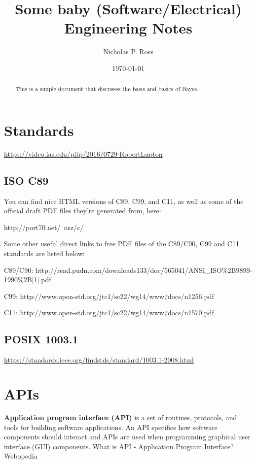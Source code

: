 \documentclass[11pt]{article}
\begin{document}
\title{Some baby (Software/Electrical) Engineering Notes}
\author{Nicholas P. Ross}
\date{\today}
\maketitle


\begin{abstract}
This is a simple document that discusses the basis and basics of Bayes. 
\end{abstract}


\tableofcontents


\newpage
\section{Standards}
\href{https://video.ias.edu/pitp/2016/0729-RobertLupton}{https://video.ias.edu/pitp/2016/0729-RobertLupton}

\subsection{ISO C89}
You can find nice HTML versions of C89, C99, and C11, as well as some of the official draft PDF files they're generated from, here:

http://port70.net/~nsz/c/

Some other useful direct links to free PDF files of the C89/C90, C99 and C11 standards are listed below:

C89/C90: http://read.pudn.com/downloads133/doc/565041/ANSI\_ISO\%2B9899-1990\%2B[1].pdf

C99: http://www.open-std.org/jtc1/sc22/wg14/www/docs/n1256.pdf

C11: http://www.open-std.org/jtc1/sc22/wg14/www/docs/n1570.pdf



\subsection{POSIX 1003.1}
\href{https://standards.ieee.org/findstds/standard/1003.1-2008.html}{https://standards.ieee.org/findstds/standard/1003.1-2008.html}




\newpage
\section{APIs}
{\bf Application program interface (API)} is a set of routines, protocols, and tools for building software applications. An API specifies how software components should interact and APIs are used when programming graphical user interface (GUI) components.
What is API - Application Program Interface? Webopedia
\end{document}
